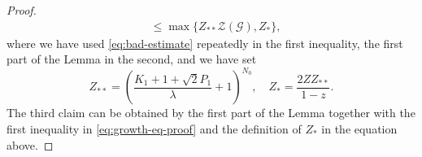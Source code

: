 \documentclass[10pt,a4paper]{amsart}
\newcommand\cG{{\mathcal G}}
\newcommand\cZ{{\mathcal Z}}
\renewcommand{\le}{\leqslant}
\begin{document}
\begin{proof}
\begin{equation}
\begin{split}
&\le \max\{Z_{**}\cZ(\cG), Z_{*}\},
\end{split}
\end{equation}
where we have used \eqref{eq:bad-estimate} repeatedly in the first inequality, the first part of the Lemma in the second, and we have set
\begin{equation}\label{eq:star-2star}
Z_{**} = \left(\frac{K_1 + 1+ \sqrt{2}P_1}{\lambda} + 1\right)^{N_0}, \quad Z_{*} = \frac{2ZZ_{**}}{1-z}.
\end{equation}
The third claim can be obtained by the first part of the Lemma together with the first inequality in \eqref{eq:growth-eq-proof} and the definition of \(Z_{*}\) in the equation above.
\end{proof}
\end{document}
